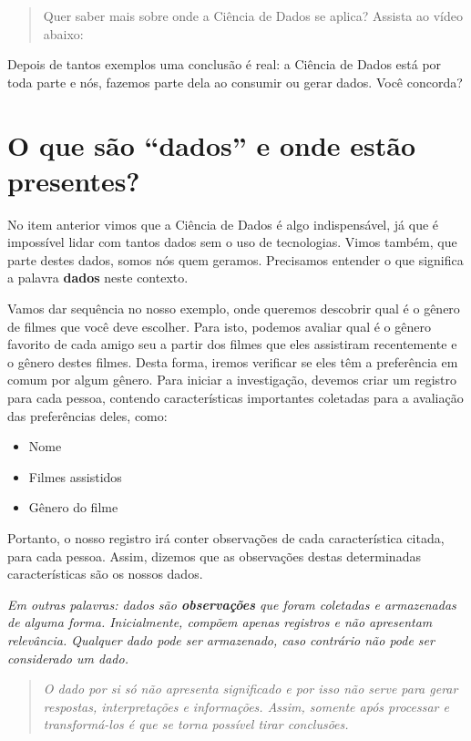 \documentclass[
  portuguese,
  oneside]{book}
\providecommand{\tightlist}{%
  \setlength{\itemsep}{0pt}\setlength{\parskip}{0pt}}
\begin{document}
\begin{quote}
Quer saber mais sobre onde a Ciência de Dados se aplica? Assista ao vídeo abaixo:
\end{quote}

Depois de tantos exemplos uma conclusão é real: a Ciência de Dados está por toda parte e nós, fazemos parte dela ao consumir ou gerar dados. Você concorda?

\hypertarget{o-que-suxe3o-dados-e-onde-estuxe3o-presentes}{%
\section{O que são ``dados'' e onde estão presentes?}\label{o-que-suxe3o-dados-e-onde-estuxe3o-presentes}}

No item anterior vimos que a Ciência de Dados é algo indispensável, já que é impossível lidar com tantos dados sem o uso de tecnologias. Vimos também, que parte destes dados, somos nós quem geramos. Precisamos entender o que significa a palavra \textbf{dados} neste contexto.

Vamos dar sequência no nosso exemplo, onde queremos descobrir qual é o gênero de filmes que você deve escolher. Para isto, podemos avaliar qual é o gênero favorito de cada amigo seu a partir dos filmes que eles assistiram recentemente e o gênero destes filmes. Desta forma, iremos verificar se eles têm a preferência em comum por algum gênero. Para iniciar a investigação, devemos criar um registro para cada pessoa, contendo características importantes coletadas para a avaliação das preferências deles, como:

\begin{itemize}
\tightlist
\item
  Nome
\item
  Filmes assistidos
\item
  Gênero do filme
\end{itemize}

Portanto, o nosso registro irá conter observações de cada característica citada, para cada pessoa. Assim, dizemos que as observações destas determinadas características são os nossos dados.

\emph{Em outras palavras: dados são \textbf{observações} que foram coletadas e armazenadas de alguma forma. Inicialmente, compõem apenas registros e não apresentam relevância. Qualquer dado pode ser armazenado, caso contrário não pode ser considerado um dado.}

\begin{quote}
\emph{O dado por si só não apresenta significado e por isso não serve para gerar respostas, interpretações e informações. Assim, somente após processar e transformá-los é que se torna possível tirar conclusões.}
\end{quote}
\end{document}
